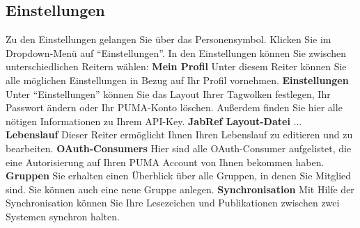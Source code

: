 \documentclass[a4paper,11pt,twoside]{scrbook}
\begin{document}
\subsection{Einstellungen}
Zu den Einstellungen gelangen Sie über das Personensymbol. Klicken Sie im Dropdown-Menü auf \enquote{Einstellungen}. In den Einstellungen können Sie zwischen unterschiedlichen Reitern wählen:\newline \newline
\textbf{Mein Profil} \newline
Unter diesem Reiter können Sie alle möglichen Einstellungen in Bezug auf Ihr Profil vornehmen.\newline \newline
\textbf{Einstellungen} \newline
Unter \enquote{Einstellungen} können Sie das Layout Ihrer Tagwolken festlegen, Ihr Passwort ändern oder Ihr PUMA-Konto löschen. Außerdem finden Sie hier alle nötigen Informationen zu Ihrem API-Key.\newline \newline
\textbf{JabRef Layout-Datei}\newline
... \newline \newline
\textbf{Lebenslauf} \newline
Dieser Reiter ermöglicht Ihnen Ihren Lebenslauf zu editieren und zu bearbeiten. \newline \newline
\textbf{OAuth-Consumers} \newline
Hier sind alle OAuth-Consumer aufgelistet, die eine Autorisierung auf Ihren PUMA Account von Ihnen bekommen haben. \newline \newline
\textbf{Gruppen}\newline
Sie erhalten einen Überblick über alle Gruppen, in denen Sie Mitglied sind. Sie können auch eine neue Gruppe anlegen. \newline \newline
\textbf{Synchronisation} \newline
Mit Hilfe der Synchronisation können Sie Ihre Lesezeichen und Publikationen zwischen zwei Systemen synchron halten. 
\end{document}
